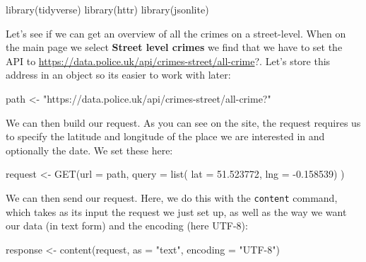 \documentclass[
]{book}
\newenvironment{Shaded}{\begin{snugshade}}{\end{snugshade}}
\newcommand{\AttributeTok}[1]{\textcolor[rgb]{0.77,0.63,0.00}{#1}}
\newcommand{\FloatTok}[1]{\textcolor[rgb]{0.00,0.00,0.81}{#1}}
\newcommand{\FunctionTok}[1]{\textcolor[rgb]{0.00,0.00,0.00}{#1}}
\newcommand{\NormalTok}[1]{#1}
\newcommand{\OtherTok}[1]{\textcolor[rgb]{0.56,0.35,0.01}{#1}}
\newcommand{\SpecialCharTok}[1]{\textcolor[rgb]{0.00,0.00,0.00}{#1}}
\newcommand{\StringTok}[1]{\textcolor[rgb]{0.31,0.60,0.02}{#1}}
\begin{document}
\begin{Shaded}
\begin{Highlighting}[]
\FunctionTok{library}\NormalTok{(tidyverse)}
\FunctionTok{library}\NormalTok{(httr)}
\FunctionTok{library}\NormalTok{(jsonlite)}
\end{Highlighting}
\end{Shaded}

Let's see if we can get an overview of all the crimes on a street-level. When on the main page we select \textbf{Street level crimes} we find that we have to set the API to \url{https://data.police.uk/api/crimes-street/all-crime}?. Let's store this address in an object so its easier to work with later:

\begin{Shaded}
\begin{Highlighting}[]
\NormalTok{path }\OtherTok{\textless{}{-}} \StringTok{"https://data.police.uk/api/crimes{-}street/all{-}crime?"}
\end{Highlighting}
\end{Shaded}

We can then build our request. As you can see on the site, the request requires us to specify the latitude and longitude of the place we are interested in and optionally the date. We set these here:

\begin{Shaded}
\begin{Highlighting}[]
\NormalTok{request }\OtherTok{\textless{}{-}} \FunctionTok{GET}\NormalTok{(}\AttributeTok{url =}\NormalTok{ path,}
\AttributeTok{query =} \FunctionTok{list}\NormalTok{(}
\AttributeTok{lat =} \FloatTok{51.523772}\NormalTok{,}
\AttributeTok{lng =} \SpecialCharTok{{-}}\FloatTok{0.158539}\NormalTok{)}
\NormalTok{)}
\end{Highlighting}
\end{Shaded}

We can then send our request. Here, we do this with the \texttt{content} command, which takes as its input the request we just set up, as well as the way we want our data (in text form) and the encoding (here UTF-8):

\begin{Shaded}
\begin{Highlighting}[]
\NormalTok{response }\OtherTok{\textless{}{-}} \FunctionTok{content}\NormalTok{(request, }\AttributeTok{as =} \StringTok{"text"}\NormalTok{, }\AttributeTok{encoding =} \StringTok{"UTF{-}8"}\NormalTok{)}
\end{Highlighting}
\end{Shaded}
\end{document}

